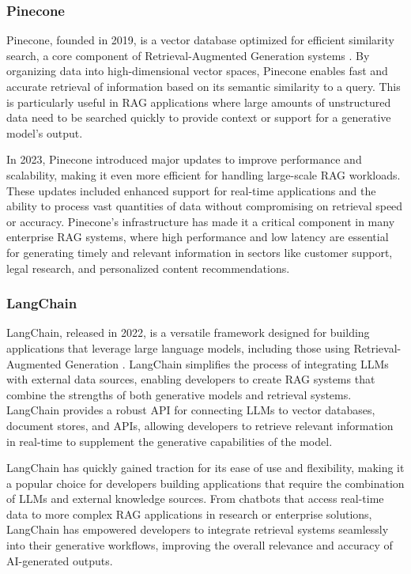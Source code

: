 \subsubsection{Pinecone}

Pinecone, founded in 2019, is a vector database optimized for efficient similarity search, a core component of Retrieval-Augmented Generation systems \cite{Pinecone}. 
By organizing data into high-dimensional vector spaces, Pinecone enables fast and accurate retrieval of information based on its semantic similarity to a query. 
This is particularly useful in RAG applications where large amounts of unstructured data need to be searched quickly to provide context or support for a generative model's output.

In 2023, Pinecone introduced major updates to improve performance and scalability, making it even more efficient for handling large-scale RAG workloads. 
These updates included enhanced support for real-time applications and the ability to process vast quantities of data without compromising on retrieval speed or accuracy. 
Pinecone's infrastructure has made it a critical component in many enterprise RAG systems, where high performance and low latency are essential for generating timely and relevant information in sectors like customer support, legal research, and personalized content recommendations.

\subsubsection{LangChain}

LangChain, released in 2022, is a versatile framework designed for building applications that leverage large language models, including those using Retrieval-Augmented Generation \cite{LangChain}. 
LangChain simplifies the process of integrating LLMs with external data sources, enabling developers to create RAG systems that combine the strengths of both generative models and retrieval systems. 
LangChain provides a robust API for connecting LLMs to vector databases, document stores, and APIs, allowing developers to retrieve relevant information in real-time to supplement the generative capabilities of the model.

LangChain has quickly gained traction for its ease of use and flexibility, making it a popular choice for developers building applications that require the combination of LLMs and external knowledge sources. 
From chatbots that access real-time data to more complex RAG applications in research or enterprise solutions, LangChain has empowered developers to integrate retrieval systems seamlessly into their generative workflows, improving the overall relevance and accuracy of AI-generated outputs.

